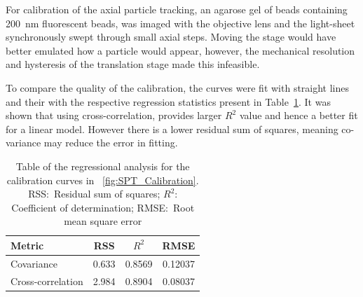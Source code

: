 For calibration of the axial particle tracking, an agarose gel of beads containing \SI{200}{\nano\meter} fluorescent beads, was imaged with the objective lens and the light-sheet synchronously swept through small axial steps.
Moving the stage would have better emulated how a particle would appear, however, the mechanical resolution and hysteresis of the translation stage made this infeasible.

To compare the quality of the calibration, %
the curves were fit with straight lines and their with the respective regression statistics present in Table~\ref{tab:linear_calibration}.
It was shown that using cross-correlation, provides larger \(R^2\) value and hence a better fit for a linear model. %
However there is a lower residual sum of squares, meaning co-variance may reduce the error in fitting.


\begin{table}
\centering
\caption[Table of the regressional analysis for the calibration curves in \figurename~\ref{fig:SPT_Calibration}.]{Table of the regressional analysis for the calibration curves in \figurename~\ref{fig:SPT_Calibration}.
RSS:~Residual sum of squares; \(R^2\): Coefficient of determination; RMSE:~Root mean square error}\label{tab:linear_calibration}
  \begin{tabular}{lccc}
    \toprule
    Metric & RSS & \(R^2\) & RMSE \\\midrule
    Covariance & 0.633 & 0.8569 & 0.12037 \\
    Cross-correlation & 2.984 & 0.8904 & 0.08037 \\
    \bottomrule
  \end{tabular}
\end{table}



